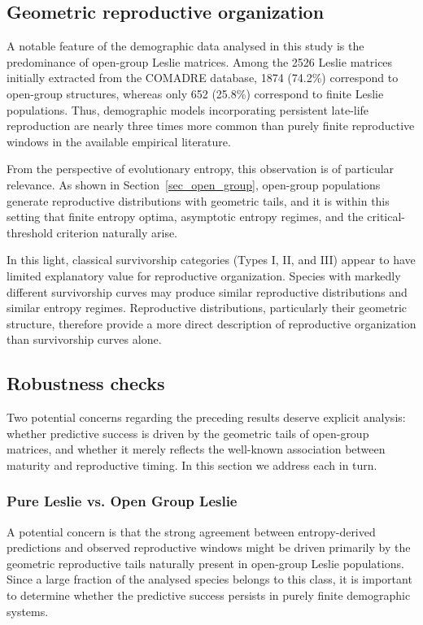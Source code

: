 \documentclass[10pt,a4paper]{amsart}
\theoremstyle{definition}
\theoremstyle{remark}
\numberwithin{equation}{section}
\begin{document}
\subsection{Geometric reproductive organization}
\label{sec_geometric_R_O}

A notable feature of the demographic data analysed in this study is
the predominance of open-group Leslie matrices. Among the 2526 Leslie
matrices initially extracted from the COMADRE database, 1874
(74.2\%) correspond to open-group structures, whereas only 652
(25.8\%) correspond to finite Leslie populations. Thus, demographic
models incorporating persistent late-life reproduction are nearly
three times more common than purely finite reproductive windows in
the available empirical literature.

From the perspective of evolutionary entropy, this observation is of
particular relevance. As shown in Section~\ref{sec_open_group},
open-group populations generate reproductive distributions with
geometric tails, and it is within this setting that finite entropy
optima, asymptotic entropy regimes, and the critical-threshold
criterion naturally arise.

In this light, classical survivorship categories (Types I, II, and
III) appear to have limited explanatory value for reproductive
organization. Species with markedly different survivorship curves may
produce similar reproductive distributions and similar
entropy regimes. Reproductive distributions, particularly their
geometric structure, therefore provide a more direct description of
reproductive organization than survivorship curves alone.

\subsection{Robustness checks}
Two potential concerns regarding the preceding results deserve explicit analysis: whether predictive success is driven by the geometric tails of open-group matrices, and whether it merely reflects the well-known association between maturity and reproductive timing. In this section we address each in turn.

\subsubsection{Pure Leslie vs. Open Group Leslie}

A potential concern is that the strong agreement between entropy-derived predictions and observed reproductive windows might be driven primarily by the geometric reproductive tails naturally present in open-group Leslie populations. Since a large fraction of the analysed species belongs to this class, it is important to determine whether the predictive success persists in purely finite demographic systems.
\end{document}
